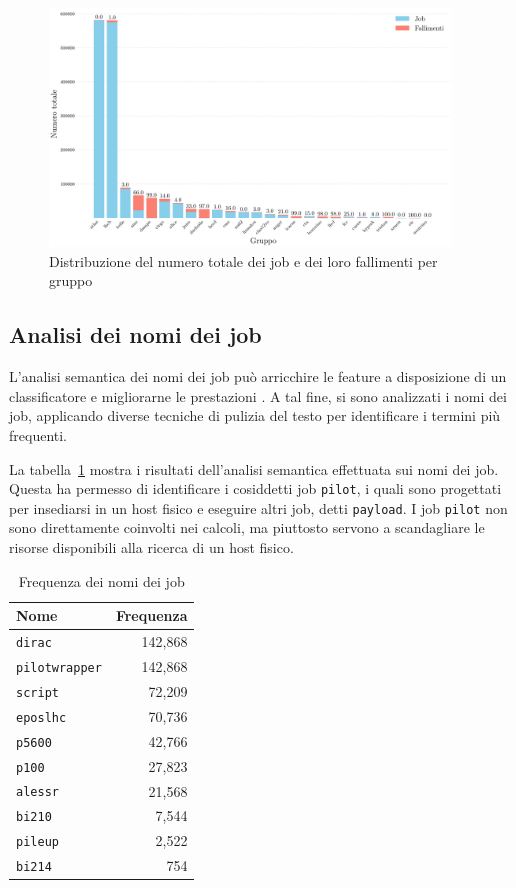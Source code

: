 \begin{figure}[!ht]
    \includegraphics[width=0.95\textwidth]{images/njobs_perqueue}
    \caption{Distribuzione del numero totale dei job e dei loro fallimenti per
    gruppo}
    \label{fig:njobs_perqueue}
\end{figure}

\subsection{Analisi dei nomi dei job}

L'analisi semantica dei nomi dei job può arricchire le feature a disposizione
di un classificatore e migliorarne le prestazioni \cite{Banjongkan2021}. A tal
fine, si sono analizzati i nomi dei job, applicando diverse tecniche di
pulizia del testo per identificare i termini più frequenti.

La tabella~\ref{table:job_names} mostra i risultati dell'analisi semantica
effettuata sui nomi dei job. Questa ha permesso di identificare i cosiddetti
job \texttt{pilot}, i quali sono progettati per insediarsi in un host fisico e
eseguire altri job, detti \texttt{payload}. I job \texttt{pilot} non sono
direttamente coinvolti nei calcoli, ma piuttosto servono a scandagliare le
risorse disponibili alla ricerca di un host fisico.

\begin{table}[!ht]
    \centering
    \caption{Frequenza dei nomi dei job}
    \begin{tabular}{lr}
        \toprule
        \textbf{Nome} & \textbf{Frequenza} \\
        \midrule
        \texttt{dirac} & 142,868 \\
        \texttt{pilotwrapper} & 142,868 \\
        \texttt{script} & 72,209 \\
        \texttt{eposlhc} & 70,736 \\
        \texttt{p5600} & 42,766 \\
        \texttt{p100} & 27,823 \\
        \texttt{alessr} & 21,568 \\
        \texttt{bi210} & 7,544 \\
        \texttt{pileup} & 2,522 \\
        \texttt{bi214} & 754 \\
        \bottomrule
    \end{tabular}
    \label{table:job_names}
\end{table}

